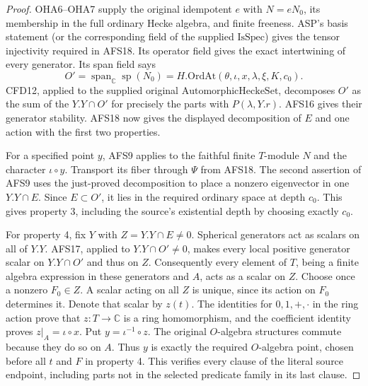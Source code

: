 \documentclass[11pt,a4paper]{article}
\numberwithin{equation}{section}
\theoremstyle{remark}\newtheorem{remark}[theorem]{Remark}
\begin{document}
\begin{proof}
OHA6--OHA7 supply the original idempotent $e$ with
$N=eN_0$, its membership in the full ordinary Hecke
algebra, and finite freeness.  ASP's basis statement
(or the corresponding field of the supplied
$\mathrm{IsSpec}$) gives the tensor injectivity required
in AFS18.  Its operator field gives the exact
intertwining of every generator.  Its span field says
\[
 O'=\operatorname{span}_{\mathbb C}\operatorname{sp}(N_0)
         =H.\mathrm{OrdAt}(\theta,\iota,x,\lambda,\xi,K,c_0).
\]
CFD12, applied to the supplied original
$\mathrm{AutomorphicHeckeSet}$, decomposes $O'$ as the
sum of the $Y.Y\cap O'$ for precisely the parts with
$P(\lambda,Y.r)$.  AFS16 gives their generator stability.
AFS18 now gives the displayed decomposition of $E$ and
one action with the first two properties.

For a specified point $y$, AFS9 applies to the faithful
finite $T$-module $N$ and the character $\iota\circ y$.
Transport its fiber through $\Psi$ from AFS18.  The
second assertion of AFS9 uses the just-proved decomposition
to place a nonzero eigenvector in one $Y.Y\cap E$.
Since $E\subset O'$, it lies in the required ordinary
space at depth $c_0$.  This gives property 3, including
the source's existential depth by choosing exactly $c_0$.

For property 4, fix $Y$ with $Z=Y.Y\cap E\ne0$.
Spherical generators act as scalars on all of $Y.Y$.
AFS17, applied to $Y.Y\cap O'\ne0$, makes every local
positive generator scalar on $Y.Y\cap O'$ and thus on
$Z$.  Consequently every element of $T$, being a
finite algebra expression in these generators and
$A$, acts as a scalar on $Z$.  Choose once a nonzero
$F_0\in Z$.  A scalar acting on all $Z$ is unique, since
its action on $F_0$ determines it.  Denote that scalar
by $z(t)$.  The identities for $0,1,+,\cdot$ in the
ring action prove that $z:T\to\mathbb C$ is a ring
homomorphism, and the coefficient identity proves
$z|_A=\iota\circ x$.  Put $y=\iota^{-1}\circ z$.
The original $O$-algebra structures commute because
they do so on $A$.  Thus $y$ is exactly the required
$O$-algebra point, chosen before all $t$ and $F$ in
property 4.  This verifies every clause of the literal
source endpoint, including parts not in the selected
predicate family in its last clause.
\end{proof}

\end{document}
